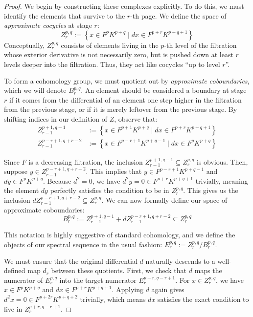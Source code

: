 \begin{proof}
    We begin by constructing these complexes explicitly. To do this, we must identify the elements that survive to the $r$-th page. We define the space of \emph{approximate cocycles} at stage $r$:
    $$
    Z^{p,q}_r:=\left\{x\in F^p K^{p+q}\mid dx\in F^{p+r}K^{p+q+1}\right\}
    $$
    Conceptually, $Z_r^{p,q}$ consists of elements living in the $p$-th level of the filtration whose exterior derivative is not necessarily zero, but is pushed down at least $r$ levels deeper into the filtration. Thus, they act like cocycles ``up to level $r$''.

    \medskip
    
    \noindent To form a cohomology group, we must quotient out by \emph{approximate coboundaries}, which we will denote $B_r^{p,q}$. An element should be considered a boundary at stage $r$ if it comes from the differential of an element one step higher in the filtration from the previous stage, or if it is merely leftover from the previous stage. By shifting indices in our definition of $Z$, observe that:
    \begin{align*}
    Z^{p+1,q-1}_{r-1}&:= \left\{x\in F^{p+1} K^{p+q}\mid dx\in F^{p+r}K^{p+q+1}\right\} \\
    Z_{r-1}^{p-r+1,q+r-2} &:= \left\{x\in F^{p-r+1} K^{p+q-1}\mid dx\in F^{p}K^{p+q}\right\} 
    \end{align*}
    
    \noindent Since $F$ is a decreasing filtration, the inclusion $Z_{r-1}^{p+1,q-1} \subseteq Z_r^{p,q}$ is obvious. Then, suppose $y\in Z_{r-1}^{p-r+1,q+r-2}$. This implies that $y\in F^{p-r+1} K^{p+q-1}$ and $dy\in F^{p} K^{p+q}$. Because $d^2 = 0$, we have $d^2y =0\in F^{p+r}K^{p+q+1}$ trivially, meaning the element $dy$ perfectly satisfies the condition to be in $Z_r^{p,q}$. This gives us the inclusion $dZ_{r-1}^{p-r+1,q+r-2}\subseteq Z_r^{p,q}$. We can now formally define our space of approximate coboundaries:
    $$
    B_r^{p,q} := Z_{r-1}^{p+1,q-1} + dZ_{r-1}^{p-r+1,q+r-2} \subseteq Z_r^{p,q}
    $$
    
    \noindent This notation is highly suggestive of standard cohomology, and we define the objects of our spectral sequence in the usual fashion: $E_r^{p,q}:= Z_r^{p,q}/B_r^{p,q}$. 

    \medskip
    
    \noindent We must ensure that the original differential $d$ naturally descends to a well-defined map $d_r$ between these quotients. First, we check that $d$ maps the numerator of $E_r^{p,q}$ into the target numerator $E_r^{p+r,q-r+1}$. For $x\in Z^{p,q}_r$, we have $x\in F^p K^{p+q}$ and $dx \in F^{p+r}K^{p+q+1}$. Applying $d$ again gives $d^2x = 0\in F^{p+2r}K^{p+q+2}$ trivially, which means $dx$ satisfies the exact condition to live in $Z_r^{p+r, q-r+1}$. 


\end{proof}

